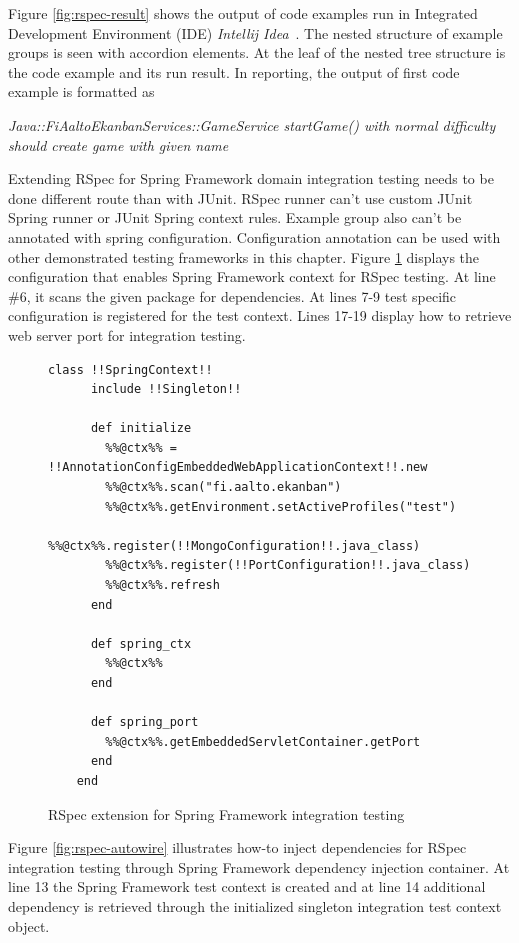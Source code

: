     Figure \ref{fig:rspec-result} shows the output of code examples run in Integrated Development Environment (IDE) \textit{Intellij Idea}~\cite{intellij}.
    The nested structure of example groups
    is seen with accordion elements. At the leaf of the nested tree structure is the code example and its run result. In
    reporting, the output of first code example is formatted as
    \begin{center}
    \textit{Java::FiAaltoEkanbanServices::GameService startGame() with normal difficulty should create game with given name}
    \end{center}

    Extending RSpec for Spring Framework domain integration testing needs to be done different route than with JUnit. RSpec
    runner can't use custom JUnit Spring runner or JUnit Spring context rules. Example group also can't be annotated with
    spring configuration. Configuration annotation can be used with other demonstrated testing frameworks in this chapter. Figure \ref{fig:rspec-config}
    displays the configuration that enables Spring Framework context for RSpec testing. At line \#6, it scans the given
    package for dependencies. At lines 7-9 test specific configuration is registered for the test context. Lines 17-19
    display how to retrieve web server port for integration testing.

    \begin{figure}[H]
        \begin{lstlisting}[style=ruby]
    class !!SpringContext!!
      include !!Singleton!!

      def initialize
        %%@ctx%% = !!AnnotationConfigEmbeddedWebApplicationContext!!.new
        %%@ctx%%.scan("fi.aalto.ekanban")
        %%@ctx%%.getEnvironment.setActiveProfiles("test")
        %%@ctx%%.register(!!MongoConfiguration!!.java_class)
        %%@ctx%%.register(!!PortConfiguration!!.java_class)
        %%@ctx%%.refresh
      end

      def spring_ctx
        %%@ctx%%
      end

      def spring_port
        %%@ctx%%.getEmbeddedServletContainer.getPort
      end
    end
        \end{lstlisting}
        \caption{RSpec extension for Spring Framework integration testing}
        \label{fig:rspec-config}
    \end{figure}

    \restoregeometry

    Figure \ref{fig:rspec-autowire}
    illustrates how-to inject dependencies for RSpec integration testing through Spring Framework dependency injection container.
    At line 13 the Spring Framework test context is created and at line 14 additional dependency is retrieved
    through the initialized singleton integration test context object.

